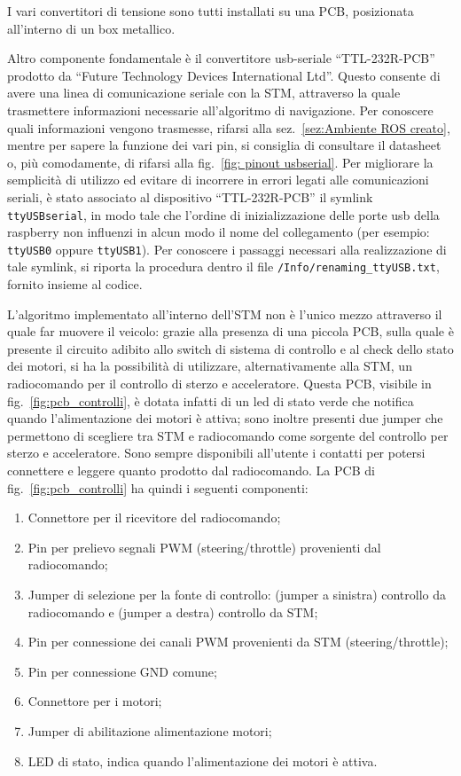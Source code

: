 I vari convertitori di tensione sono tutti installati su una PCB, posizionata all’interno di un box metallico.

Altro componente fondamentale è il convertitore usb-seriale ``TTL-232R-PCB'' prodotto da 
``Future Technology Devices International Ltd''. 
Questo consente di avere una linea di comunicazione seriale con la STM, attraverso la quale trasmettere informazioni necessarie all'algoritmo di navigazione.
Per conoscere quali informazioni vengono trasmesse, rifarsi alla sez.~\ref{sez:Ambiente ROS creato}, mentre per sapere la funzione dei vari pin, si consiglia di 
consultare il datasheet o, più comodamente, di rifarsi alla fig.~\ref{fig: pinout usbserial}. 
Per migliorare la semplicità di utilizzo ed evitare di incorrere in errori legati alle comunicazioni seriali, è stato associato al dispositivo ``TTL-232R-PCB'' 
il symlink \texttt{ttyUSBserial}, in modo tale che l’ordine di inizializzazione delle porte usb della raspberry non influenzi in alcun modo il nome del collegamento 
(per esempio: \texttt{ttyUSB0} oppure  \texttt{ttyUSB1}).
Per conoscere i passaggi necessari alla realizzazione di tale symlink, si riporta la procedura dentro il file \texttt{/Info/renaming\_ttyUSB.txt}, 
fornito insieme al codice.


L'algoritmo implementato all'interno dell'STM non è l'unico mezzo attraverso il quale far muovere il veicolo: grazie alla presenza di una piccola PCB, 
sulla quale è presente il circuito adibito allo switch di sistema di controllo e al check dello stato dei motori, si ha la possibilità di utilizzare, 
alternativamente alla STM, un radiocomando per il controllo di sterzo e acceleratore.
Questa PCB, visibile in fig.~\ref{fig:pcb_controlli}, è dotata infatti di un led di stato verde che notifica quando l’alimentazione dei motori è attiva; 
sono inoltre presenti due jumper che permettono di scegliere tra STM e radiocomando come sorgente del controllo per sterzo e acceleratore. 
Sono sempre disponibili all’utente i contatti per potersi connettere e leggere quanto prodotto dal radiocomando. 
La PCB di fig.~\ref{fig:pcb_controlli} ha quindi i seguenti componenti:

\begin{enumerate}
    \item Connettore per il ricevitore del radiocomando;
    \item Pin per prelievo segnali PWM (steering/throttle) provenienti dal radiocomando;
    \item Jumper di selezione per la fonte di controllo: (jumper a sinistra) controllo da radiocomando e (jumper a destra) controllo da STM;
	\item Pin per connessione dei canali PWM provenienti da STM (steering/throttle);
    \item Pin per connessione GND comune;
    \item Connettore per i motori;
    \item Jumper di abilitazione alimentazione motori;
    \item LED di stato, indica quando l'alimentazione dei motori è attiva.
\end{enumerate}


